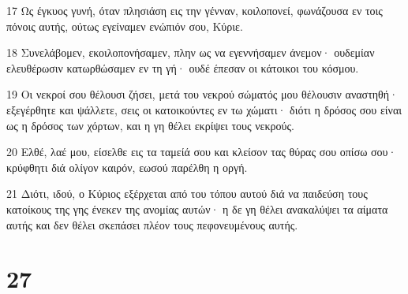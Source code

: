 \par 17 Ως έγκυος γυνή, όταν πλησιάση εις την γένναν, κοιλοπονεί, φωνάζουσα εν τοις πόνοις αυτής, ούτως εγείναμεν ενώπιόν σου, Κύριε.
\par 18 Συνελάβομεν, εκοιλοπονήσαμεν, πλην ως να εγεννήσαμεν άνεμον· ουδεμίαν ελευθέρωσιν κατωρθώσαμεν εν τη γή· ουδέ έπεσαν οι κάτοικοι του κόσμου.
\par 19 Οι νεκροί σου θέλουσι ζήσει, μετά του νεκρού σώματός μου θέλουσιν αναστηθή· εξεγέρθητε και ψάλλετε, σεις οι κατοικούντες εν τω χώματι· διότι η δρόσος σου είναι ως η δρόσος των χόρτων, και η γη θέλει εκρίψει τους νεκρούς.
\par 20 Ελθέ, λαέ μου, είσελθε εις τα ταμείά σου και κλείσον τας θύρας σου οπίσω σου· κρύφθητι διά ολίγον καιρόν, εωσού παρέλθη η οργή.
\par 21 Διότι, ιδού, ο Κύριος εξέρχεται από του τόπου αυτού διά να παιδεύση τους κατοίκους της γης ένεκεν της ανομίας αυτών· η δε γη θέλει ανακαλύψει τα αίματα αυτής και δεν θέλει σκεπάσει πλέον τους πεφονευμένους αυτής.

\chapter{27}

